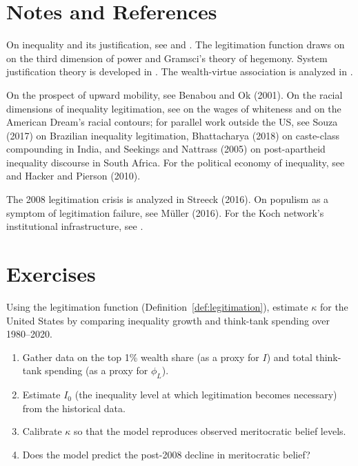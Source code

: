 \section{Notes and References}
\label{sec:ch24-notes}

On inequality and its justification, see \textcite{piketty2014} and \textcite{stiglitz2012}.
The legitimation function draws on \textcite{lukes2005} on the third dimension of power and Gramsci's theory of hegemony.
System justification theory is developed in \textcite{jost2004}.
The wealth-virtue association is analyzed in \textcite{sandel2012}.

On the prospect of upward mobility, see Benabou and Ok (2001).
On the racial dimensions of inequality legitimation, see \textcite{du-bois2007} on the wages of whiteness and \textcite{hochschild2016} on the American Dream's racial contours; for parallel work outside the US, see Souza (2017) on Brazilian inequality legitimation, Bhattacharya (2018) on caste-class compounding in India, and Seekings and Nattrass (2005) on post-apartheid inequality discourse in South Africa.
For the political economy of inequality, see \textcite{acemoglu2012} and Hacker and Pierson (2010).

The 2008 legitimation crisis is analyzed in Streeck (2016).
On populism as a symptom of legitimation failure, see M\"{u}ller (2016).
For the Koch network's institutional infrastructure, see \textcite{mayer2016}.

\section{Exercises}

\begin{exercise}
Using the legitimation function (Definition~\ref{def:legitimation}), estimate $\kappa$ for the United States by comparing inequality growth and think-tank spending over 1980--2020.
\begin{enumerate}[nosep]
  \item Gather data on the top 1\% wealth share (as a proxy for $I$) and total think-tank spending (as a proxy for $\phi_L$).
  \item Estimate $I_0$ (the inequality level at which legitimation becomes necessary) from the historical data.
  \item Calibrate $\kappa$ so that the model reproduces observed meritocratic belief levels.
  \item Does the model predict the post-2008 decline in meritocratic belief?
\end{enumerate}
\end{exercise}

